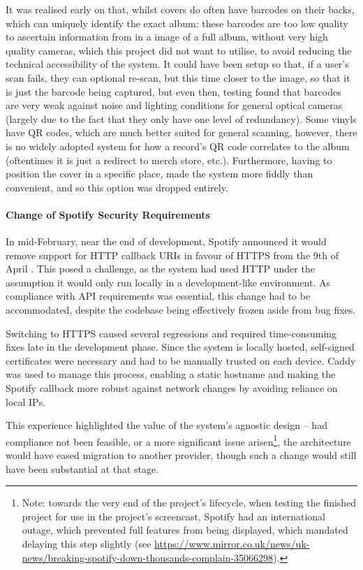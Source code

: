                 It was realised early on that, whilst covers do often have barcodes on their backs, which can uniquely identify the exact album: these barcodes are too low quality to ascertain information from in a image of a full album, without very high quality cameras, which this project did not want to utilise, to avoid reducing the technical accessibility of the system. It could have been setup so that, if a user's scan fails, they can optional re-scan, but this time closer to the image, so that it is just the barcode being captured, but even then, testing found that barcodes are very weak against noise and lighting conditions for general optical cameras (largely due to the fact that they only have one level of redundancy). Some vinyls have QR codes, which are much better suited for general scanning, however, there is no widely adopted system for how a record's QR code correlates to the album (oftentimes it is just a redirect to merch store, etc.). Furthermore, having to position the cover in a specific place, made the system more fiddly than convenient, and so this option was dropped entirely.
    
                \paragraph{Change of Spotify Security Requirements}
    
                In mid-February, near the end of development, Spotify announced it would remove support for HTTP callback URIs in favour of HTTPS from the 9th of April \cite{spotify2025security}. This posed a challenge, as the system had used HTTP under the assumption it would only run locally in a development-like environment. As compliance with API requirements was essential, this change had to be accommodated, despite the codebase being effectively frozen aside from bug fixes.
    
                Switching to HTTPS caused several regressions and required time-consuming fixes late in the development phase. Since the system is locally hosted, self-signed certificates were necessary and had to be manually trusted on each device. Caddy was used to manage this process, enabling a static hostname and making the Spotify callback more robust against network changes by avoiding reliance on local IPs.
    
                This experience highlighted the value of the system’s agnostic design -- had compliance not been feasible, or a more significant issue arisen\footnote{Note: towards the very end of the project's lifecycle, when testing the finished project for use in the project's screencast, Spotify had an international outage, which prevented full features from being displayed, which mandated delaying this step slightly (see \href{https://www.mirror.co.uk/news/uk-news/breaking-spotify-down-thousands-complain-35066298}{https://www.mirror.co.uk/news/uk-news/breaking-spotify-down-thousands-complain-35066298}).}, the architecture would have eased migration to another provider, though such a change would still have been substantial at that stage.
    
